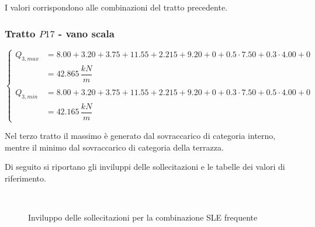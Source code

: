 I valori corrispondono alle combinazioni del tratto precedente.

\subsubsection*{Tratto $P17$ - vano scala}
\begin{equation*}
	\begin{cases}
		Q_{3,max} &= 8.00+3.20+3.75 + 11.55+2.215+9.20 + 0+ 0.5\cdot7.50+ 0.3\cdot4.00 +0\\
		&= 42.865\,\dfrac{kN}{m}\\\\
		Q_{3,min} &= 8.00+3.20+3.75 + 11.55+2.215+9.20 + 0 + 0.3\cdot7.50 +0.5\cdot 4.00 + 0\\
		&= 42.165\,\dfrac{kN}{m}
	\end{cases}
\end{equation*}

Nel terzo tratto il massimo è generato dal sovraccarico di categoria interno, mentre il minimo dal sovraccarico di categoria della terrazza.

Di seguito si riportano gli  inviluppi delle sollecitazioni e le tabelle dei valori di riferimento.

\begin{figure}
	\centering
	\\
	\caption{Inviluppo delle sollecitazioni per la combinazione SLE frequente}
	\label{fig:sleFreqEnvelope}
\end{figure}

